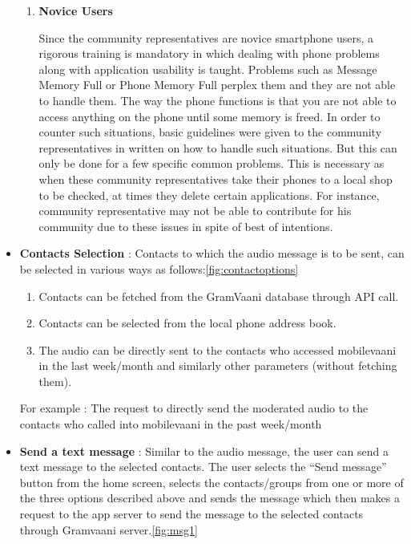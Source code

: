 \begin{itemize}
\begin {enumerate}
\item \textbf {Novice Users}

Since the community representatives are novice smartphone users, a rigorous training is mandatory in which dealing with phone problems along with application usability is taught. Problems such as Message Memory Full or Phone Memory Full perplex them and they are not able to handle them. The way the phone functions is that you are not able to access anything on the phone until some memory is freed. In order to counter such situations, basic guidelines were given to the community representatives in written on how to handle such situations. But this can only be done for a few specific common problems. This is necessary as when these community representatives take their phones to a local shop to be checked, at times they delete certain applications. For instance, community representative may not be able to contribute for his community due to these issues in spite of best of intentions.


\end {enumerate}


\item \textbf{Contacts Selection }: Contacts to which the audio message is to be sent, can be selected in various ways as follows:\ref{fig:contactoptions}
	\begin{enumerate}
	\item	Contacts can be fetched from the GramVaani database through API call.
	\item Contacts can be selected from the local phone address book.
	\item The audio can be directly sent to the contacts who accessed mobilevaani in the last week/month and similarly other parameters (without fetching them).
	\end{enumerate}
	
For example : The request to directly send the moderated audio to the contacts who called into mobilevaani in the past week/month


	
\item \textbf{Send a text message }: Similar to the audio message, the user can send a text message to the selected contacts. The user selects the “Send message” button from the home screen, selects the
contacts/groups from one or more of the three options described above and sends the
message which then makes a request to the app server to send the message to the
selected contacts through Gramvaani server.\ref{fig:msg1}


\end{itemize}
